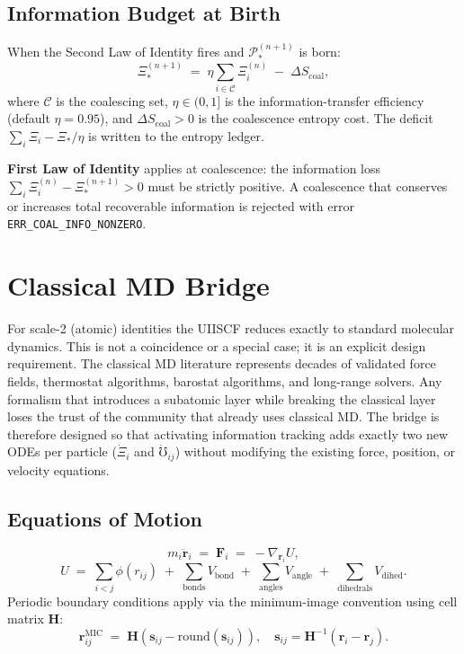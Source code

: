 \documentclass[11pt,a4paper]{article}
\newcommand{\Pid}{\mathscr{P}}
\newcommand{\Rec}{\Xi}
\newcommand{\Cond}{\mho}
\newcommand{\rvec}{\mathbf{r}}
\newcommand{\Fvec}{\mathbf{F}}
\begin{document}
\subsection{Information Budget at Birth}

When the Second Law of Identity fires and $\Pid_*^{(n+1)}$ is born:
\[
  \Rec_*^{(n+1)} \;=\;
  \eta \sum_{i \in \mathcal{C}} \Rec_i^{(n)}
  \;-\; \Delta S_{\mathrm{coal}} ,
\]
where $\mathcal{C}$ is the coalescing set, $\eta \in (0,1]$ is the
information-transfer efficiency (default $\eta = 0.95$), and
$\Delta S_{\mathrm{coal}} > 0$ is the coalescence entropy cost.  The deficit
$\sum_i \Rec_i - \Rec_*/\eta$ is written to the entropy ledger.

\begin{smlaw}
\textbf{First Law of Identity} applies at coalescence: the information loss
$\sum_i \Rec_i^{(n)} - \Rec_*^{(n+1)} > 0$ must be strictly positive.  A
coalescence that conserves or increases total recoverable information is
rejected with error \texttt{ERR\_COAL\_INFO\_NONZERO}.
\end{smlaw}

\section{Classical MD Bridge}\label{sec:cmd}

For scale-2 (atomic) identities the UIISCF reduces exactly to standard
molecular dynamics.  This is not a coincidence or a special case; it is an
explicit design requirement.  The classical MD literature represents decades
of validated force fields, thermostat algorithms, barostat algorithms, and
long-range solvers.  Any formalism that introduces a subatomic layer while
breaking the classical layer loses the trust of the community that already
uses classical MD.  The bridge is therefore designed so that activating
information tracking adds exactly two new ODEs per particle ($\dot{\Rec}_i$
and $\dot{\Cond}_{ij}$) without modifying the existing force, position, or
velocity equations.

\subsection{Equations of Motion}

\[
  m_i \ddot{\rvec}_i \;=\; \Fvec_i \;=\; -\nabla_{\rvec_i} U ,
\]
\[
  U \;=\; \sum_{i<j} \phi(r_{ij}) \;+\;
          \sum_{\mathrm{bonds}} V_{\mathrm{bond}} \;+\;
          \sum_{\mathrm{angles}} V_{\mathrm{angle}} \;+\;
          \sum_{\mathrm{dihedrals}} V_{\mathrm{dihed}} .
\]
Periodic boundary conditions apply via the minimum-image convention using
cell matrix $\mathbf{H}$:
\[
  \rvec_{ij}^{\mathrm{MIC}} \;=\;
  \mathbf{H}\!\left(
    \mathbf{s}_{ij} - \mathrm{round}(\mathbf{s}_{ij})
  \right),
  \quad
  \mathbf{s}_{ij} = \mathbf{H}^{-1}(\rvec_i - \rvec_j) .
\]
\end{document}
